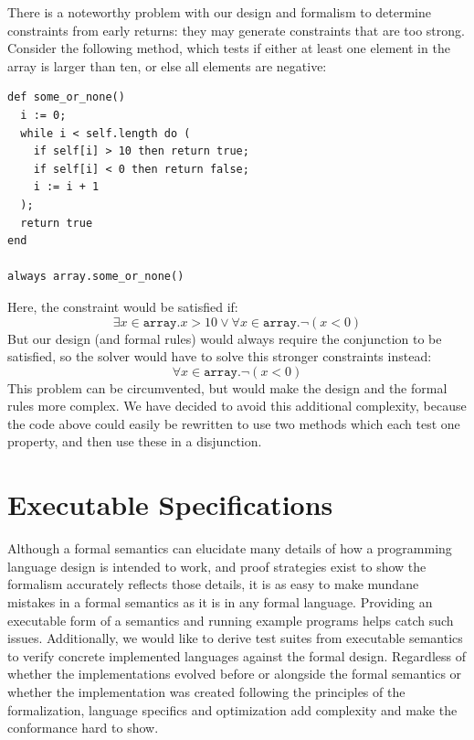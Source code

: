 There is a noteworthy problem with our design and formalism to determine
constraints from early returns: they may generate constraints that are too
strong. Consider the following method, which tests if either at least one
element in the array is larger than ten, or else all elements are negative:
\begin{lstlisting}
def some_or_none()
  i := 0;
  while i < self.length do (
    if self[i] > 10 then return true;
    if self[i] < 0 then return false;
    i := i + 1
  );
  return true
end

always array.some_or_none()
\end{lstlisting}
Here, the constraint would be satisfied if:
\[
  \exists x\in \texttt{array}. x > 10 \vee \forall x\in \texttt{array}. \neg(x < 0)
\]
But our design (and formal rules) would always require the conjunction to be
satisfied, so the solver would have to solve this stronger constraints instead:
\[
  \forall x\in \texttt{array}. \neg(x < 0)
\]
This problem can be circumvented, but would make the design and the formal rules
more complex. We have decided to avoid this additional complexity, because the
code above could easily be rewritten to use two methods which each test one
property, and then use these in a disjunction.

\section{Executable Specifications}
\label{sec:exec-spec}

Although a formal semantics can elucidate many details of how a programming
language design is intended to work, and proof strategies exist to show the
formalism accurately reflects those details, it is as easy to make mundane
mistakes in a formal semantics as it is in any formal language. Providing an
executable form of a semantics and running example programs helps catch such
issues. Additionally, we would like to derive test suites from executable
semantics to verify concrete implemented languages against the formal
design. Regardless of whether the implementations evolved before or alongside
the formal semantics or whether the implementation was created following the
principles of the formalization, language specifics and optimization add
complexity and make the conformance hard to show.

